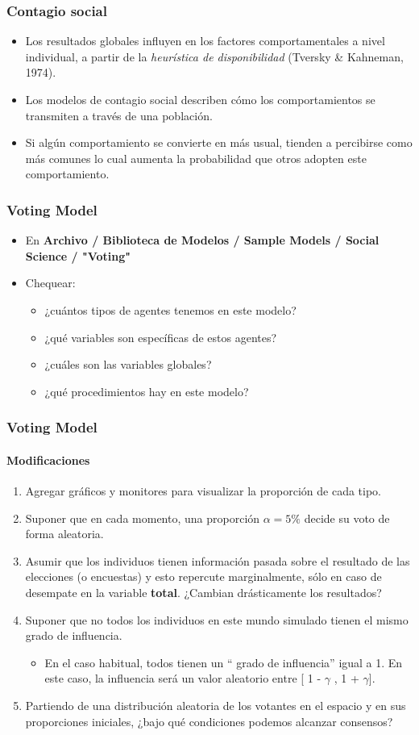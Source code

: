 \documentclass[11pt]{beamer}
\begin{document}
\begin{frame}
	\frametitle{Contagio social}
\begin{itemize}
	\item Los resultados globales influyen en los factores comportamentales a nivel individual, a partir de la \textit{heurística de disponibilidad} (Tversky \& Kahneman, 1974).
    \item Los modelos de contagio social describen cómo los comportamientos se transmiten a través de una población.
    \item Si algún comportamiento se convierte en más usual, tienden a percibirse como más comunes lo cual aumenta la probabilidad que otros adopten este comportamiento.
\end{itemize}
\end{frame}

\begin{frame}
	\frametitle{Voting Model}
\begin{itemize}
	\item En \textbf{Archivo / Biblioteca de Modelos / Sample Models / Social Science / "Voting"}
	\item Chequear:
	\begin{itemize}
		\item ¿cuántos tipos de agentes tenemos en este modelo?
		\item ¿qué variables son específicas de estos agentes? 
		\item ¿cuáles son las variables globales?
		\item ¿qué procedimientos hay en este modelo?
	\end{itemize}
\end{itemize}		
\end{frame}

\begin{frame}
	\frametitle{Voting Model}
\framesubtitle{Modificaciones}
\begin{enumerate}
	\item Agregar gráficos y monitores para visualizar la proporción de cada tipo.
	\item Suponer que en cada momento, una proporción $\alpha=5\%$ decide su voto de forma aleatoria.
	\item Asumir que los individuos tienen información pasada sobre el resultado de las elecciones (o encuestas) y esto repercute marginalmente, sólo en caso de desempate en la variable \textbf{total}. ¿Cambian drásticamente los resultados?
	\item Suponer que no todos los individuos en este mundo simulado tienen el mismo grado de influencia.
	\begin{itemize}
		\item En el caso habitual, todos tienen un `` grado de influencia'' igual a 1. En este caso, la influencia será un valor aleatorio entre [ 1 - $\gamma$ , 1 + $\gamma$]. 
	\end{itemize}  
	\item Partiendo de una distribución aleatoria de los votantes en el espacio y en sus proporciones iniciales, ¿bajo qué condiciones podemos alcanzar consensos?  
\end{enumerate}
\end{frame}
\end{document}
